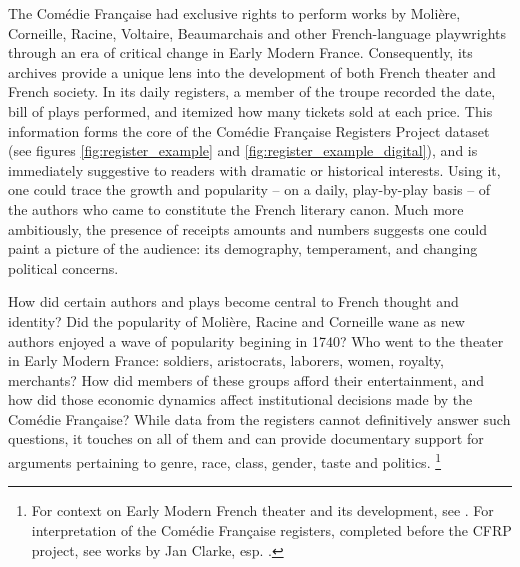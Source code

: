 \documentclass[	DIV=calc,%
							paper=a4,%
							fontsize=11pt,%
							twocolumn]{scrartcl}	 					%
\begin{document}
The Comédie Française had exclusive rights to perform works by Molière, Corneille, Racine, Voltaire, Beaumarchais and other French-language playwrights through an era of critical change in Early Modern France.  Consequently, its archives provide a unique lens into the development of both French theater and French society.  In its daily registers, a member of the troupe recorded the date, bill of plays performed, and itemized how many tickets sold at each price.  This information forms the core of the Comédie Française Registers Project dataset (see figures \ref{fig:register_example} and \ref{fig:register_example_digital}), and is immediately suggestive to readers with dramatic or historical interests.  Using it, one could trace the growth and popularity -- on a daily, play-by-play basis -- of the authors who came to constitute the French literary canon.  Much more ambitiously, the presence of receipts amounts and numbers suggests one could paint a picture of the audience: its demography, temperament, and changing political concerns.

How did certain authors and plays become central to French thought and identity?  Did the popularity of Molière, Racine and Corneille wane as new authors enjoyed a wave of popularity begining in 1740?  Who went to the theater in Early Modern France: soldiers, aristocrats, laborers, women, royalty, merchants?  How did members of these groups afford their entertainment, and how did those economic dynamics affect institutional decisions made by the Comédie Française?  While data from the registers cannot definitively answer such questions, it touches on all of them and can provide documentary support for arguments pertaining to genre, race, class, gender, taste and politics.%
\footnote{For context on Early Modern French theater and its development, see \cite{HOWARTH:1997}. For interpretation of the Comédie Française registers, completed before the CFRP project, see works by Jan Clarke, esp. \cite{CLARKE:2001}.}
\end{document}
